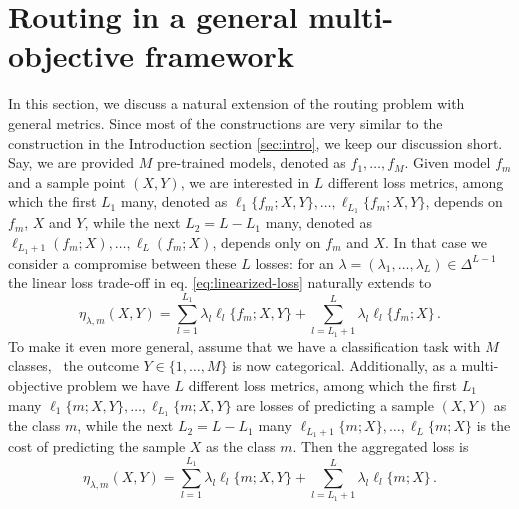 \section{Routing in a general multi-objective framework}\label{sec:general-multi-obj}

In this section, we discuss a natural extension of the routing problem with general metrics. Since most of the constructions are very similar to the construction in the Introduction section \ref{sec:intro}, we keep our discussion short.  Say, we are provided $M$ pre-trained models, denoted as $f_1, \dots,f_M$. Given model $f_m$ and a sample point $(X, Y)$,  we are interested in $L$ different loss metrics, among which the first $L_1 $ many, denoted as $\ell_1\{f_m; X, Y\} , \dots, \ell_{L_1}\{f_m; X, Y\}$, depends on $f_m$, $X$ and $Y$, while the next $L_2 = L - L_1$ many, denoted as $\ell_{L_1+ 1}(f_m; X), \dots , \ell_{L}(f_m; X)$, depends only on $f_m$ and $X$.  In that case we consider a compromise between these $L$ losses: for an $\lambda = (\lambda_1 , \dots, \lambda_L) \in\Delta^{L-1} $ the linear loss trade-off in eq. \eqref{eq:linearized-loss} naturally extends to 
\begin{equation} \label{eq:linearized-loss-gen}
 \textstyle \eta_{\lambda, m}(X, Y) =  \sum_{l = 1}^{L_1}\lambda_l \ell_l\{f_m; X, Y\} + \sum_{l = L_1 + 1}^{L}\lambda_l \ell_l\{f_m; X\}   \,.
\end{equation} 
To make it even more general, assume that we have a classification task with $M$ classes, \ie \ the outcome $Y \in \{1, \dots, M\}$ is now categorical. Additionally, as a multi-objective problem we have $L$ different loss metrics, among which the first $L_1 $ many $\ell_1\{m; X, Y\} , \dots, \ell_{L_1}\{m; X, Y\}$ are losses  of predicting a sample $(X, Y)$ as the class $m$, while the next $L_2 = L - L_1$ many $\ell_{L_1+ 1}\{m; X\}, \dots , \ell_{L}\{m; X\}$ is the cost of predicting the sample $X$ as the class $m$. Then the aggregated loss is 
\begin{equation} \label{eq:linearized-loss-gen-2}
 \textstyle \eta_{\lambda, m}(X, Y) =  \sum_{l = 1}^{L_1}\lambda_l \ell_l\{m; X, Y\} + \sum_{l = L_1 + 1}^{L}\lambda_l \ell_l\{m; X\}   \,.
\end{equation} 

